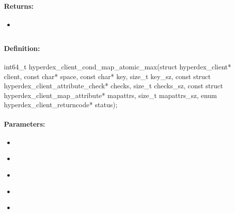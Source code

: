 \paragraph{Returns:}
\begin{itemize}[noitemsep]
\item {}\\

\end{itemize}

\pagebreak
\subsection{}
\label{api:c:cond_map_atomic_max}


\paragraph{Definition:}
\begin{ccode}
int64_t hyperdex_client_cond_map_atomic_max(struct hyperdex_client* client,
        const char* space,
        const char* key, size_t key_sz,
        const struct hyperdex_client_attribute_check* checks, size_t checks_sz,
        const struct hyperdex_client_map_attribute* mapattrs, size_t mapattrs_sz,
        enum hyperdex_client_returncode* status);
\end{ccode}

\paragraph{Parameters:}
\begin{itemize}[noitemsep]
\item {}\\

\item {}\\

\item {}\\

\item {}\\

\item {}\\

\end{itemize}

